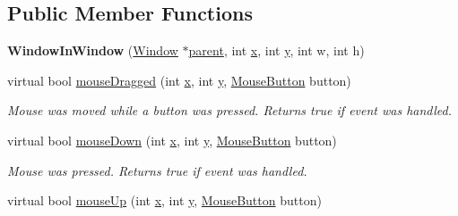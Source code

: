 \subsection*{Public Member Functions}
\begin{DoxyCompactItemize}
\item 
\hypertarget{classGUI_1_1WindowInWindow_ad104bdfd46a945b903786867f10b30f4}{{\bfseries Window\-In\-Window} (\hyperlink{classGUI_1_1Window}{Window} $\ast$\hyperlink{classGUI_1_1Window_a2e593ff65e7702178d82fe9010a0b539}{parent}, int \hyperlink{classGUI_1_1Window_a6ca6a80ca00c9e1d8ceea8d3d99a657d}{x}, int \hyperlink{classGUI_1_1Window_a0ee8e923aff2c3661fc2e17656d37adf}{y}, int w, int h)}\label{classGUI_1_1WindowInWindow_ad104bdfd46a945b903786867f10b30f4}

\item 
\hypertarget{classGUI_1_1WindowInWindow_aae1c727d831a2fa15b5fd195815b9797}{virtual bool \hyperlink{classGUI_1_1WindowInWindow_aae1c727d831a2fa15b5fd195815b9797}{mouse\-Dragged} (int \hyperlink{classGUI_1_1Window_a6ca6a80ca00c9e1d8ceea8d3d99a657d}{x}, int \hyperlink{classGUI_1_1Window_a0ee8e923aff2c3661fc2e17656d37adf}{y}, \hyperlink{namespaceGUI_ad06082a7b02aa73697f39eb8e0856de9}{Mouse\-Button} button)}\label{classGUI_1_1WindowInWindow_aae1c727d831a2fa15b5fd195815b9797}

\begin{DoxyCompactList}\small\item\em Mouse was moved while a button was pressed. Returns true if event was handled. \end{DoxyCompactList}\item 
\hypertarget{classGUI_1_1WindowInWindow_a6212dcd5e9bd80fa075e5f6447e3270c}{virtual bool \hyperlink{classGUI_1_1WindowInWindow_a6212dcd5e9bd80fa075e5f6447e3270c}{mouse\-Down} (int \hyperlink{classGUI_1_1Window_a6ca6a80ca00c9e1d8ceea8d3d99a657d}{x}, int \hyperlink{classGUI_1_1Window_a0ee8e923aff2c3661fc2e17656d37adf}{y}, \hyperlink{namespaceGUI_ad06082a7b02aa73697f39eb8e0856de9}{Mouse\-Button} button)}\label{classGUI_1_1WindowInWindow_a6212dcd5e9bd80fa075e5f6447e3270c}

\begin{DoxyCompactList}\small\item\em Mouse was pressed. Returns true if event was handled. \end{DoxyCompactList}\item 
\hypertarget{classGUI_1_1WindowInWindow_ae430cc6d85b2e1495f5a64c3642396e1}{virtual bool \hyperlink{classGUI_1_1WindowInWindow_ae430cc6d85b2e1495f5a64c3642396e1}{mouse\-Up} (int \hyperlink{classGUI_1_1Window_a6ca6a80ca00c9e1d8ceea8d3d99a657d}{x}, int \hyperlink{classGUI_1_1Window_a0ee8e923aff2c3661fc2e17656d37adf}{y}, \hyperlink{namespaceGUI_ad06082a7b02aa73697f39eb8e0856de9}{Mouse\-Button} button)}\label{classGUI_1_1WindowInWindow_ae430cc6d85b2e1495f5a64c3642396e1}


\end{DoxyCompactItemize}
